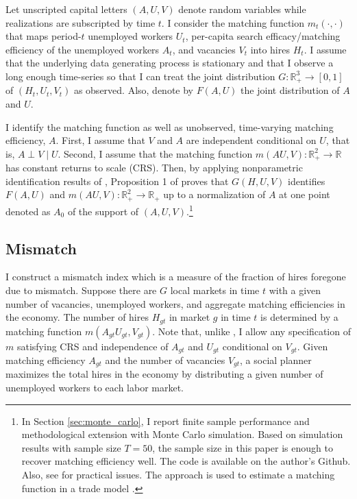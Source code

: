 \documentclass[12pt]{article}
\begin{document}
Let unscripted capital letters $(A, U, V)$ denote random variables while realizations are subscripted by time $t$. 
I consider the matching function $m_t(\cdot,\cdot)$ that maps period-$t$ unemployed workers $U_t$, per-capita search efficacy/matching efficiency of the unemployed workers $A_t$, and vacancies $V_t$ into hires $H_t$.
I assume that the underlying data generating process is stationary and that I observe a long enough time-series so that I can treat the joint distribution $G: \mathbb{R}_{+}^3 \rightarrow[0,1]$ of $\left(H_t, U_t, V_t\right)$ as observed. 
Also, denote by $F(A, U)$ the joint distribution of $A$ and $U$.

I identify the matching function as well as unobserved, time-varying matching efficiency, $A .$ 
First, I assume that $V$ and $A$ are independent conditional on $U$, that is, $A \perp V \mid U$. 
Second, I assume that the matching function $m(AU,V):\mathbb{R}_{+}^2 \rightarrow \mathbb{R}$ has constant returns to scale (CRS). 
Then, by applying nonparametric identification results of \cite{matzkin2003nonparametric}, Proposition 1 of \cite{lange2020beyond} proves that $G(H, U, V)$ identifies $F(A, U)$ and $m(A U, V): \mathbb{R}_{+}^2 \rightarrow \mathbb{R}_{+}$ up to a normalization of $A$ at one point denoted as $A_0$ of the support of $(A, U, V)$.\footnote{In Section \ref{sec:monte_carlo}, I report finite sample performance and methodological extension with Monte Carlo simulation. Based on simulation results with sample size $T=50$, the sample size in this paper is enough to recover matching efficiency well. The code is available on the author's Github. Also, see \cite{brancaccio2020guide} for practical issues. The approach is used to estimate a matching function in a trade model \citep{brancaccio2020geography,brancaccio2023search}.}

\subsection{Mismatch}
I construct a mismatch index which is a measure of the fraction of hires foregone due to mismatch. 
Suppose there are $G$ local markets in time $t$ with a given number of vacancies, unemployed workers, and aggregate matching efficiencies in the economy.
The number of hires $H_{gt}$ in market $g$ in time $t$ is determined by a matching function $ m(A_{gt}U_{gt},V_{gt})$. 
Note that, unlike \cite{csahin2014mismatch}, I allow any specification of $m$ satisfying CRS and independence of $A_{gt}$ and $U_{gt}$ conditional on $V_{gt}$.
Given matching efficiency $A_{gt}$ and the number of vacancies $V_{gt}$, a social planner maximizes the total hires in the
economy by distributing a given number of unemployed workers to each labor market.
\end{document}
